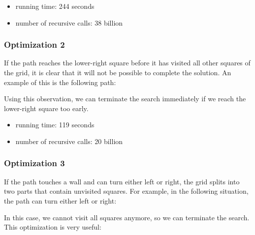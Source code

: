 \begin{itemize}
\item
running time: 244 seconds
\item
number of recursive calls: 38 billion
\end{itemize}

\subsubsection{Optimization 2}

If the path reaches the lower-right square
before it has visited all other squares of the grid,
it is clear that
it will not be possible to complete the solution.
An example of this is the following path:

\begin{center}
\end{center}
Using this observation, we can terminate the search
immediately if we reach the lower-right square too early.
\begin{itemize}
\item
running time: 119 seconds
\item
number of recursive calls: 20 billion
\end{itemize}

\subsubsection{Optimization 3}

If the path touches a wall
and can turn either left or right,
the grid splits into two parts
that contain unvisited squares.
For example, in the following situation,
the path can turn either left or right:

\begin{center}
\end{center}
In this case, we cannot visit all squares anymore,
so we can terminate the search.
This optimization is very useful:

